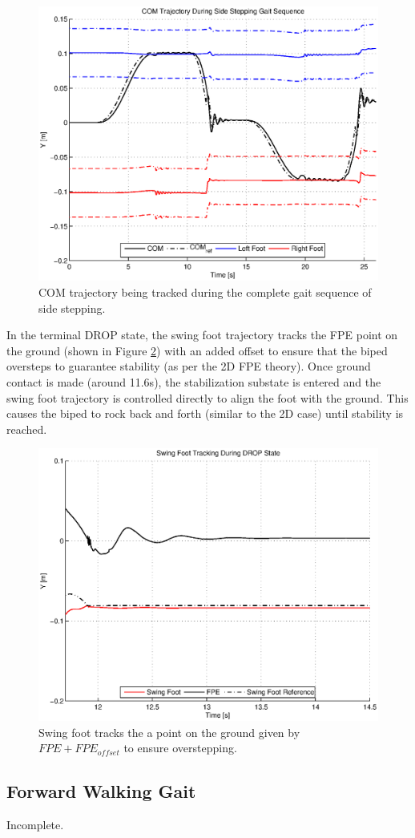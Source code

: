 \begin{figure}[!h]
	\centering
    \includegraphics[scale=0.8]{fig/ch4/comtraj.eps}
  	\caption{COM trajectory being tracked during the complete gait sequence of side stepping.}
	\label{fig:comtraj}
\end{figure}


In the terminal DROP state, the swing foot trajectory tracks the FPE point on the ground (shown in Figure \ref{fig:fpetrack}) with an added offset to ensure that the biped oversteps to guarantee stability (as per the 2D FPE theory). Once ground contact is made (around 11.6s), the stabilization substate is entered and the swing foot trajectory is controlled directly to align the foot with the ground. This causes the biped to rock back and forth (similar to the 2D case) until stability is reached.

\begin{figure}[!h]
	\centering
    \includegraphics[scale=0.8]{fig/ch4/fpetrack.eps}
  	\caption{Swing foot tracks the a point on the ground given by $FPE + FPE_{offset}$ to ensure overstepping.}
	\label{fig:fpetrack}
\end{figure}


\subsection{Forward Walking Gait} %
\label{sub:forward_walking_gait}
Incomplete. 


